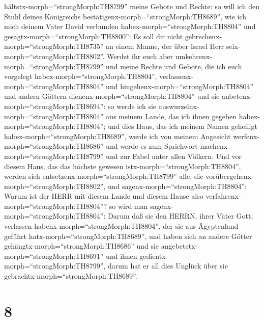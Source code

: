 hältstx-morph=``strongMorph:TH8799'' meine Gebote und Rechte:
 so will ich den Stuhl deines Königreichs
bestätigenx-morph=``strongMorph:TH8689'', wie ich mich deinem Vater
David verbunden habex-morph=``strongMorph:TH8804'' und
gesagtx-morph=``strongMorph:TH8800'': Es soll dir nicht
gebrechenx-morph=``strongMorph:TH8735'' an einem Manne, der über Israel
Herr seix-morph=``strongMorph:TH8802''.  Werdet ihr euch
aber umkehrenx-morph=``strongMorph:TH8799'' und meine Rechte und Gebote,
die ich euch vorgelegt habex-morph=``strongMorph:TH8804'',
verlassenx-morph=``strongMorph:TH8804'' und
hingehenx-morph=``strongMorph:TH8804'' und andern Göttern
dienenx-morph=``strongMorph:TH8804'' und sie
anbetenx-morph=``strongMorph:TH8694'':  so werde ich sie
auswurzelnx-morph=``strongMorph:TH8804'' aus meinem Lande, das ich ihnen
gegeben habex-morph=``strongMorph:TH8804''; und dies Haus, das ich
meinem Namen geheiligt habex-morph=``strongMorph:TH8689'', werde ich von
meinem Angesicht werfenx-morph=``strongMorph:TH8686'' und werde es zum
Sprichwort machenx-morph=``strongMorph:TH8799'' und zur Fabel unter
allen Völkern.  Und vor diesem Haus, das das höchste
gewesen istx-morph=``strongMorph:TH8804'', werden sich
entsetzenx-morph=``strongMorph:TH8799'' alle, die
vorübergehenx-morph=``strongMorph:TH8802'', und
sagenx-morph=``strongMorph:TH8804'': Warum ist der HERR mit diesem Lande
und diesem Hause also verfahrenx-morph=``strongMorph:TH8804''?
 so wird man sagenx-morph=``strongMorph:TH8804'': Darum daß
sie den HERRN, ihrer Väter Gott, verlassen
habenx-morph=``strongMorph:TH8804'', der sie aus Ägyptenland geführt
hatx-morph=``strongMorph:TH8689'', und haben sich an andere Götter
gehängtx-morph=``strongMorph:TH8686'' und sie
angebetetx-morph=``strongMorph:TH8691'' und ihnen
gedientx-morph=``strongMorph:TH8799'', darum hat er all dies Unglück
über sie gebrachtx-morph=``strongMorph:TH8689''.

\hypertarget{section-7}{%
\section{8}\label{section-7}}

